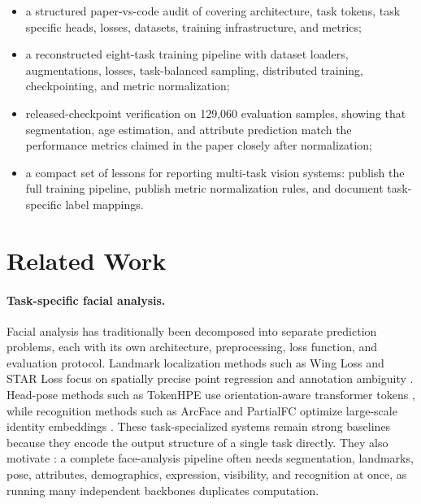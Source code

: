 \begin{itemize}
\item a structured paper-vs-code audit of \method covering architecture, task tokens, task specific heads, losses, datasets, training infrastructure, and metrics;
\item a reconstructed eight-task training pipeline with dataset loaders, augmentations, losses, task-balanced sampling, distributed training, checkpointing, and metric normalization;
\item released-checkpoint verification on 129,060 evaluation samples, showing that segmentation, age estimation, and attribute prediction match the performance metrics claimed in the paper closely after normalization;
\item a compact set of lessons for reporting multi-task vision systems: publish the full training pipeline, publish metric normalization rules, and document task-specific label mappings.
\end{itemize}

\section{Related Work}

\paragraph{Task-specific facial analysis.}
Facial analysis has traditionally been decomposed into separate prediction problems, each with its own architecture, preprocessing, loss function, and evaluation protocol. Landmark localization methods such as Wing Loss and STAR Loss focus on spatially precise point regression and annotation ambiguity \citep{wing2018,star2023}. Head-pose methods such as TokenHPE use orientation-aware transformer tokens \citep{tokenhpe2023}, while recognition methods such as ArcFace and PartialFC optimize large-scale identity embeddings \citep{arcface2019,partialfc2021}. These task-specialized systems remain strong baselines because they encode the output structure of a single task directly. They also motivate \method: a complete face-analysis pipeline often needs segmentation, landmarks, pose, attributes, demographics, expression, visibility, and recognition at once, as running many independent backbones duplicates computation.

